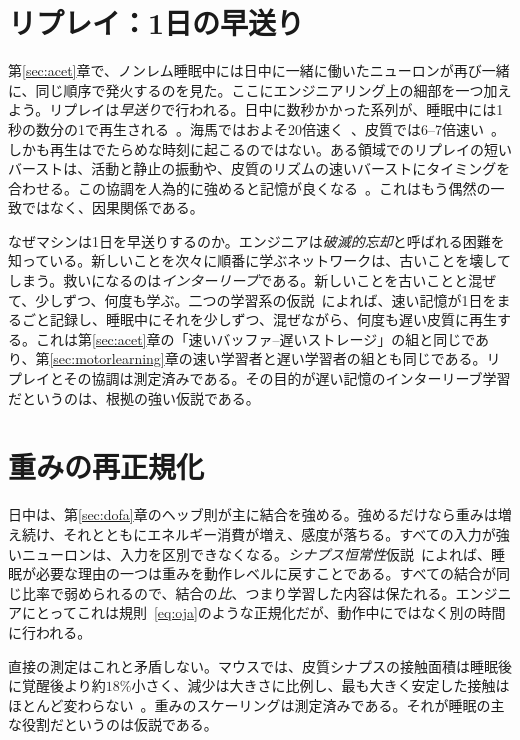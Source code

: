 \section{リプレイ：1日の早送り}

第\ref{sec:acet}章で、ノンレム睡眠中には日中に一緒に働いたニューロンが再び一緒に、同じ順序で発火するのを見た。ここにエンジニアリング上の細部を一つ加えよう。リプレイは\emph{早送り}で行われる。日中に数秒かかった系列が、睡眠中には1秒の数分の1で再生される~\cite{Nadasdy1999}。海馬ではおよそ20倍速く~\cite{LeeWilson2002}、皮質では6--7倍速い~\cite{Euston2007}。しかも再生はでたらめな時刻に起こるのではない。ある領域でのリプレイの短いバーストは、活動と静止の振動や、皮質のリズムの速いバーストにタイミングを合わせる。この協調を人為的に強めると記憶が良くなる~\cite{Maingret2016}。これはもう偶然の一致ではなく、因果関係である。

なぜマシンは1日を早送りするのか。エンジニアは\emph{破滅的忘却}と呼ばれる困難を知っている。新しいことを次々に順番に学ぶネットワークは、古いことを壊してしまう。救いになるのは\emph{インターリーブ}である。新しいことを古いことと混ぜて、少しずつ、何度も学ぶ。二つの学習系の仮説~\cite{McClelland1995}によれば、速い記憶が1日をまるごと記録し、睡眠中にそれを少しずつ、混ぜながら、何度も遅い皮質に再生する。これは第\ref{sec:acet}章の「速いバッファ--遅いストレージ」の組と同じであり、第\ref{sec:motorlearning}章の速い学習者と遅い学習者の組とも同じである。リプレイとその協調は測定済みである。その目的が遅い記憶のインターリーブ学習だというのは、根拠の強い仮説である。

\section{重みの再正規化}

日中は、第\ref{sec:dofa}章のヘッブ則が主に結合を強める。強めるだけなら重みは増え続け、それとともにエネルギー消費が増え、感度が落ちる。すべての入力が強いニューロンは、入力を区別できなくなる。\emph{シナプス恒常性}仮説~\cite{TononiCirelli2014}によれば、睡眠が必要な理由の一つは重みを動作レベルに戻すことである。すべての結合が同じ比率で弱められるので、結合の\emph{比}、つまり学習した内容は保たれる。エンジニアにとってこれは規則~\eqref{eq:oja}のような正規化だが、動作中にではなく別の時間に行われる。

直接の測定はこれと矛盾しない。マウスでは、皮質シナプスの接触面積は睡眠後に覚醒後より約$18\%$小さく、減少は大きさに比例し、最も大きく安定した接触はほとんど変わらない~\cite{deVivo2017}。重みのスケーリングは測定済みである。それが睡眠の主な役割だというのは仮説である。

